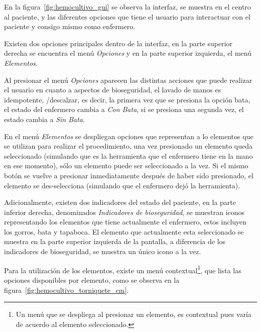En la figura~\ref{fig:hemocultivo_gui} se observa la interfaz, se muestra en el
centro al paciente, y las diferentes opciones que tiene el usuario para
interactuar con el paciente y consigo mismo como enfermero.

Existen dos opciones principales dentro de la interfaz, en la parte superior
derecha se encuentra el menú \emph{Opciones} y en la parte superior izquierda, el menú
\emph{Elementos}.

Al presionar el menú \emph{Opciones} aparecen las distintas
acciones que puede realizar el usuario en cuanto a aspectos de bioseguridad, el
lavado de manos es idempotente, /descalzar, es decir, la primera vez que se presiona la opción
bata, el estado del enfermero cambia a \emph{Con Bata}, si se presiona una
segunda vez, el estado cambia a \emph{Sin Bata}.

En el menú \emph{Elementos} se despliegan opciones que representan a lo elementos que se
utilizan para realizar el procedimiento, una vez presionado un elemento queda
seleccionado (simulando que es la herramienta que el enfermero tiene en la mano
en ese momento), sólo un elemento puede ser seleccionado a la vez. Si el mismo
botón se vuelve a presionar inmediatamente después de haber sido presionado, el
elemento se des-selecciona (simulando que el enfermero dejó la herramienta).

Adicionalmente, existen dos indicadores del estado del paciente, en la parte
inferior derecha, denominados \emph{Indicadores de bioseguridad}, se muestran
iconos representando los elementos que tiene actualmente el enfermero, estos
incluyen los gorros, bata y tapaboca. El elemento que actualmente esta
seleccionado se muestra en la parte superior izquierda de la pantalla, a
diferencia de los indicadores de bioseguridad, se muestra un único icono a la vez.


Para la utilización de los elementos, existe un menú contextual\footnote{Un menú
    que se despliega al presionar un elemento, es contextual pues varía de
    acuerdo al elemento seleccionado.}, que lista las opciones disponibles por
elemento, como se observa en la figura~\ref{fig:hemocultivo_torniquete_cm}.

